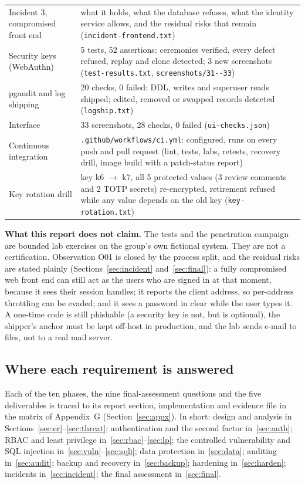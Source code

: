 \documentclass[10pt,a4paper]{article}
\newcommand{\code}[1]{\nolinkurl{#1}}
\newenvironment{warn}{\begin{tcolorbox}[colback=danger!6,colframe=danger!60,boxrule=.6pt,arc=3pt,left=6pt,right=6pt,top=3pt,bottom=3pt]\small}{\end{tcolorbox}}
\begin{document}
\begin{center}
\begin{tabularx}{\linewidth}{@{}L{5.4cm}Y@{}}
Incident 3, compromised front end & what it holds, what the database refuses, what the identity service allows, and the residual risks that remain (\code{incident-frontend.txt})\\
Security keys (WebAuthn) & 5 tests, 52 assertions: ceremonies verified, every defect refused, replay and clone detected; 3 new screenshots (\code{test-results.txt}, \code{screenshots/31--33})\\
pgaudit and log shipping & 20 checks, 0 failed: DDL, writes and superuser reads shipped; edited, removed or swapped records detected (\code{logship.txt})\\
Interface & 33 screenshots, 28 checks, 0 failed (\code{ui-checks.json})\\
Continuous integration & \code{.github/workflows/ci.yml}: configured, runs on every push and pull request (lint, tests, labs, retests, recovery drill, image build with a patch-status report)\\
Key rotation drill & key k6 $\rightarrow$ k7, all 5 protected values (3 review comments and 2 TOTP secrets) re-encrypted, retirement refused while any value depends on the old key (\code{key-rotation.txt})\\
\bottomrule
\end{tabularx}
\end{center}

\begin{warn}
\textbf{What this report does not claim.} The tests and the penetration campaign are bounded lab exercises on the group's own fictional system. They are not a certification. Observation O01 is closed by the process split, and the residual risks are stated plainly (Sections~\ref{sec:incident} and~\ref{sec:final}): a fully compromised web front end can still act as the users who are signed in at that moment, because it sees their session handles; it reports the client address, so per-address throttling can be evaded; and it sees a password in clear while the user types it. A one-time code is still phishable (a security key is not, but is optional), the shipper's anchor must be kept off-host in production, and the lab sends e-mail to files, not to a real mail server.
\end{warn}

\subsection{Where each requirement is answered}
Each of the ten phases, the nine final-assessment questions and the five deliverables is traced to its report section, implementation and evidence file in the matrix of Appendix~G (Section~\ref{sec:appx}). In short: design and analysis in Sections~\ref{sec:er}--\ref{sec:threat}; authentication and the second factor in~\ref{sec:auth}; RBAC and least privilege in~\ref{sec:rbac}--\ref{sec:lp}; the controlled vulnerability and SQL injection in~\ref{sec:vuln}--\ref{sec:sqli}; data protection in~\ref{sec:data}; auditing in~\ref{sec:audit}; backup and recovery in~\ref{sec:backup}; hardening in~\ref{sec:harden}; incidents in~\ref{sec:incident}; the final assessment in~\ref{sec:final}.
\end{document}
